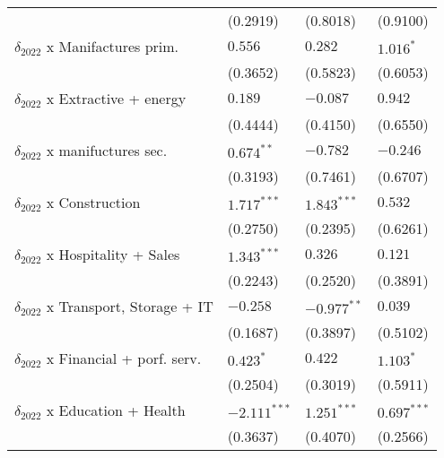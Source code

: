 \begin{tabular}{llll}
                                                   &           (0.2919) &           (0.8018) &           (0.9100) \\
$\delta_{2022}$ x Manifactures prim.               &            $0.556$ &            $0.282$ &          $1.016^*$ \\
                                                   &           (0.3652) &           (0.5823) &           (0.6053) \\
$\delta_{2022}$ x Extractive + energy              &            $0.189$ &           $-0.087$ &            $0.942$ \\
                                                   &           (0.4444) &           (0.4150) &           (0.6550) \\
$\delta_{2022}$ x manifuctures sec.                &       $0.674^{**}$ &           $-0.782$ &           $-0.246$ \\
                                                   &           (0.3193) &           (0.7461) &           (0.6707) \\
$\delta_{2022}$ x Construction                     &      $1.717^{***}$ &      $1.843^{***}$ &            $0.532$ \\
                                                   &           (0.2750) &           (0.2395) &           (0.6261) \\
$\delta_{2022}$ x Hospitality + Sales              &      $1.343^{***}$ &            $0.326$ &            $0.121$ \\
                                                   &           (0.2243) &           (0.2520) &           (0.3891) \\
$\delta_{2022}$ x Transport, Storage + IT          &           $-0.258$ &      $-0.977^{**}$ &            $0.039$ \\
                                                   &           (0.1687) &           (0.3897) &           (0.5102) \\
$\delta_{2022}$ x Financial + porf. serv.          &          $0.423^*$ &            $0.422$ &          $1.103^*$ \\
                                                   &           (0.2504) &           (0.3019) &           (0.5911) \\
$\delta_{2022}$ x Education + Health               &     $-2.111^{***}$ &      $1.251^{***}$ &      $0.697^{***}$ \\
                                                   &           (0.3637) &           (0.4070) &           (0.2566) \\

\end{tabular}
